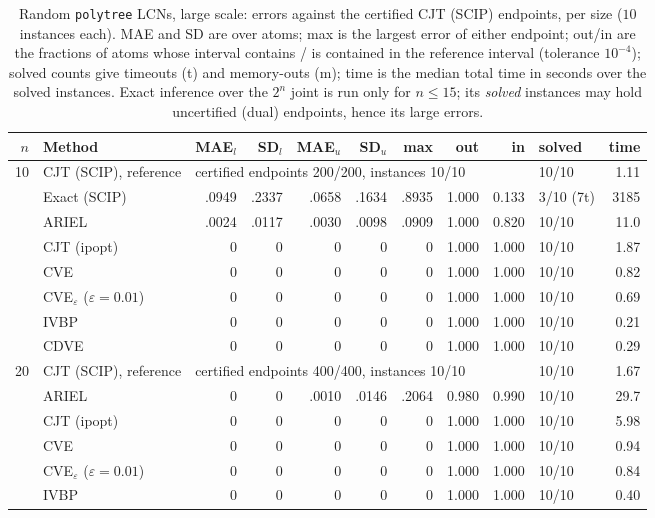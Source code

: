 \begin{table}[htbp]
\centering
\scriptsize
\caption{Random \texttt{polytree} LCNs, large scale: errors against the certified CJT (SCIP) endpoints, per size ($10$ instances each). MAE and SD are over atoms; max is the largest error of either endpoint; out/in are the fractions of atoms whose interval contains / is contained in the reference interval (tolerance $10^{-4}$); solved counts give timeouts (t) and memory-outs (m); time is the median total time in seconds over the solved instances. Exact inference over the $2^n$ joint is run only for $n \le 15$; its \emph{solved} instances may hold uncertified (dual) endpoints, hence its large errors.}
\label{tab:full-polytree-large}
\begin{tabular}{rlrrrrrrrlr}
\toprule
$n$ & Method & MAE$_l$ & SD$_l$ & MAE$_u$ & SD$_u$ & max & out & in & solved & time \\
\midrule
10 & CJT (SCIP), reference & \multicolumn{7}{l}{certified endpoints 200/200, instances 10/10} & 10/10 & 1.11 \\
 & Exact (SCIP) & .0949 & .2337 & .0658 & .1634 & .8935 & 1.000 & 0.133 & 3/10 (7t) & 3185 \\
 & ARIEL & .0024 & .0117 & .0030 & .0098 & .0909 & 1.000 & 0.820 & 10/10 & 11.0 \\
 & CJT (ipopt) & 0 & 0 & 0 & 0 & 0 & 1.000 & 1.000 & 10/10 & 1.87 \\
 & CVE & 0 & 0 & 0 & 0 & 0 & 1.000 & 1.000 & 10/10 & 0.82 \\
 & CVE$_\varepsilon$ ($\varepsilon{=}0.01$) & 0 & 0 & 0 & 0 & 0 & 1.000 & 1.000 & 10/10 & 0.69 \\
 & IVBP & 0 & 0 & 0 & 0 & 0 & 1.000 & 1.000 & 10/10 & 0.21 \\
 & CDVE & 0 & 0 & 0 & 0 & 0 & 1.000 & 1.000 & 10/10 & 0.29 \\
\midrule
20 & CJT (SCIP), reference & \multicolumn{7}{l}{certified endpoints 400/400, instances 10/10} & 10/10 & 1.67 \\
 & ARIEL & 0 & 0 & .0010 & .0146 & .2064 & 0.980 & 0.990 & 10/10 & 29.7 \\
 & CJT (ipopt) & 0 & 0 & 0 & 0 & 0 & 1.000 & 1.000 & 10/10 & 5.98 \\
 & CVE & 0 & 0 & 0 & 0 & 0 & 1.000 & 1.000 & 10/10 & 0.94 \\
 & CVE$_\varepsilon$ ($\varepsilon{=}0.01$) & 0 & 0 & 0 & 0 & 0 & 1.000 & 1.000 & 10/10 & 0.84 \\
 & IVBP & 0 & 0 & 0 & 0 & 0 & 1.000 & 1.000 & 10/10 & 0.40 \\

\end{tabular}
\end{table}
